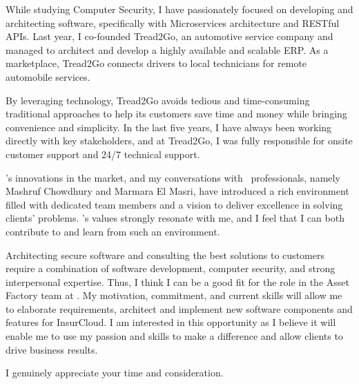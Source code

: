 \documentclass[11pt, letterpaper]{awesome-cv}
\begin{document}
\begin{cvletter}
\begin{letterbodyen}
  
    While studying Computer Security, I have passionately focused on developing and architecting software, specifically with Microservices architecture and RESTful APIs. Last year, I co-founded Tread2Go, an automotive service company and managed to architect and develop a highly available and scalable ERP. As a marketplace, Tread2Go connects drivers to local technicians for remote automobile services.

    By leveraging technology, Tread2Go avoids tedious and time-consuming traditional approaches to help its customers save time and money while bringing convenience and simplicity. In the last five years, I have always been working directly with key stakeholders, and at Tread2Go, I was fully responsible for onsite customer support and 24/7 technical support.
    
    \putcompanyname's innovations in the market, and my conversations with \putcompanyname \ professionals, namely Mashruf Chowdhury and Marmara El Masri, have introduced a rich environment filled with dedicated team members and a vision to deliver excellence in solving clients' problems. \putcompanyname's values strongly resonate with me, and I feel that I can both contribute to and learn from such an environment.
    
    Architecting secure software and consulting the best solutions to customers require a combination of software development, computer security, and strong interpersonal expertise. Thus, I think I can be a good fit for the \putposition role in the Asset Factory team at \putcompanyname. My motivation, commitment, and current skills will allow me to elaborate requirements, architect and implement new software components and features for InsurCloud. I am interested in this opportunity as I believe it will enable me to use my passion and skills to make a difference and allow clients to drive business results.
    
    I genuinely appreciate your time and consideration.

  \end{letterbodyen}
\makeletterclosing

\end{cvletter}
\end{document}

